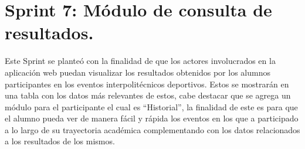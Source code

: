 	
	\section{Sprint 7: Módulo de consulta de resultados.}
	\noindent Este Sprint se planteó con la finalidad de que los actores involucrados en la aplicación web puedan visualizar los resultados obtenidos por los alumnos participantes en los eventos interpolitécnicos deportivos. 
	Estos se mostrarán en una tabla con los datos más relevantes de estos, cabe destacar que se agrega un módulo para el participante el cual es “Historial”, la finalidad de este es para que el alumno pueda ver de manera fácil y rápida los eventos en los que a participado a lo largo de su trayectoria académica complementando con los datos relacionados a los resultados de los mismos.